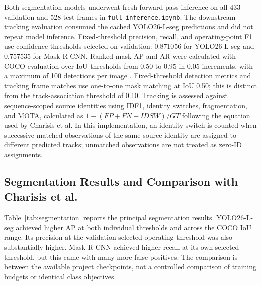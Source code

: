 \documentclass[11pt,a4paper]{article}
\begin{document}
Both segmentation models underwent fresh forward-pass inference on all 433 validation and 528 test frames in \texttt{full-inference.ipynb}. The downstream tracking evaluation consumed the cached YOLO26-L-seg predictions and did not repeat model inference. Fixed-threshold precision, recall, and operating-point F1 use confidence thresholds selected on validation: 0.871056 for YOLO26-L-seg and 0.757535 for Mask R-CNN. Ranked mask AP and AR were calculated with COCO evaluation over IoU thresholds from 0.50 to 0.95 in 0.05 increments, with a maximum of 100 detections per image \cite{coco}. Fixed-threshold detection metrics and tracking frame matches use one-to-one mask matching at IoU 0.50; this is distinct from the track-association threshold of 0.10. Tracking is assessed against sequence-scoped source identities using IDF1, identity switches, fragmentation, and MOTA, calculated as $1-(FP+FN+IDSW)/GT$ following the equation used by Charisis et al. In this implementation, an identity switch is counted when successive matched observations of the same source identity are assigned to different predicted tracks; unmatched observations are not treated as zero-ID assignments.

\subsection{Segmentation Results and Comparison with Charisis et al.}

Table~\ref{tab:segmentation} reports the principal segmentation results. YOLO26-L-seg achieved higher AP at both individual thresholds and across the COCO IoU range. Its precision at the validation-selected operating threshold was also substantially higher. Mask R-CNN achieved higher recall at its own selected threshold, but this came with many more false positives. The comparison is between the available project checkpoints, not a controlled comparison of training budgets or identical class objectives.

\begin{table}[!htbp]
\centering\scriptsize
\caption{Test segmentation metrics and published Charisis reference. The harmonic mAP--mAR value is distinct from fixed-threshold operating-point F1.}
\label{tab:segmentation}
\end{table}
\end{document}

